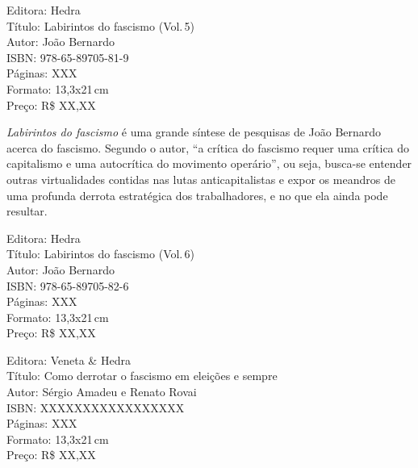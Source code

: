 \begin{ficha}
Editora: Hedra\\
Título: Labirintos do fascismo (Vol.\,5)\\
Autor: João Bernardo\\ 
ISBN: 978-65-89705-81-9\\
Páginas: XXX\\
Formato: 13,3x21\,cm\\
Preço: R\$ XX,XX\\
\end{ficha}

\pagebreak


\noindent{}\textit{Labirintos do fascismo} é uma grande síntese de pesquisas de João Bernardo acerca do fascismo. Segundo o autor, ``a crítica do fascismo requer uma crítica do capitalismo e uma autocrítica do movimento operário'', ou seja, busca-se entender outras virtualidades contidas nas lutas anticapitalistas e expor os meandros de uma profunda derrota estratégica dos trabalhadores, e no que ela ainda pode resultar. %

\begin{ficha}
Editora: Hedra\\
Título: Labirintos do fascismo (Vol.\,6)\\
Autor: João Bernardo\\ 
ISBN: 978-65-89705-82-6\\
Páginas: XXX\\
Formato: 13,3x21\,cm\\
Preço: R\$ XX,XX\\
\end{ficha}

\pagebreak


\noindent{}\lipsum[2]

\begin{ficha}
Editora: Veneta \& Hedra\\
Título: Como derrotar o fascismo em eleições e sempre\\
Autor: Sérgio Amadeu e Renato Rovai\\ 
ISBN: XXXXXXXXXXXXXXXXX\\
Páginas: XXX\\
Formato: 13,3x21\,cm\\
Preço: R\$ XX,XX\\
\end{ficha}


